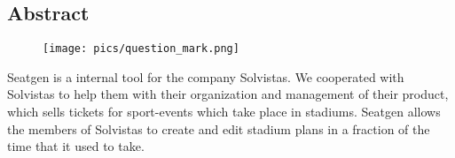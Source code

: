 \begin{spacing}{1}
    \chapter*{Abstract}
\end{spacing}
\begin{wrapfigure}{r}{0.3\textwidth}
    \begin{center}
      \texttt{[image: pics/question\_mark.png]}
    \end{center}
\end{wrapfigure}
Seatgen is a internal tool for the company Solvistas. We cooperated with Solvistas to help them with their organization and management of their product, which sells tickets for sport-events which take place in stadiums. Seatgen allows the members of Solvistas to create and edit stadium plans in a fraction of the time that it used to take.
\newpage

